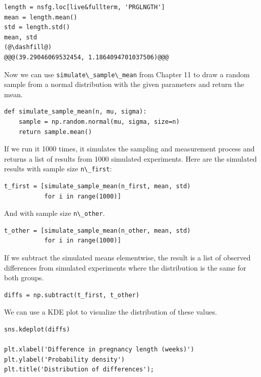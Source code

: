 \begin{lstlisting}[]
length = nsfg.loc[live&fullterm, 'PRGLNGTH']
mean = length.mean()
std = length.std()
mean, std
(@\dashfill@)
@@@(39.29046069532454, 1.1864094701037506)@@@
\end{lstlisting}

Now we can use \passthrough{\lstinline!simulate\_sample\_mean!} from
Chapter 11 to draw a random sample from a normal distribution with the
given parameters and return the mean.

\begin{lstlisting}[]
def simulate_sample_mean(n, mu, sigma):
    sample = np.random.normal(mu, sigma, size=n)
    return sample.mean()
\end{lstlisting}

If we run it 1000 times, it simulates the sampling and measurement
process and returns a list of results from 1000 simulated experiments.
Here are the simulated results with sample size
\passthrough{\lstinline!n\_first!}:

\begin{lstlisting}[]
t_first = [simulate_sample_mean(n_first, mean, std)
           for i in range(1000)]
\end{lstlisting}

And with sample size \passthrough{\lstinline!n\_other!}.

\begin{lstlisting}[]
t_other = [simulate_sample_mean(n_other, mean, std)
           for i in range(1000)]
\end{lstlisting}

If we subtract the simulated means elementwise, the result is a list of
observed differences from simulated experiments where the distribution
is the same for both groups.

\begin{lstlisting}[]
diffs = np.subtract(t_first, t_other)
\end{lstlisting}

We can use a KDE plot to visualize the distribution of these values.

\begin{lstlisting}[]
sns.kdeplot(diffs)

plt.xlabel('Difference in pregnancy length (weeks)')
plt.ylabel('Probability density')
plt.title('Distribution of differences');
\end{lstlisting}

